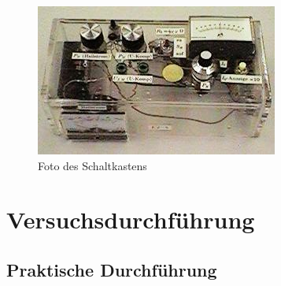 \documentclass[12pt]{scrartcl}
\begin{document}
\begin{figure}[htbp] 
  \centering
    \includegraphics[scale = 0.5]{kasten.JPG}
  	\caption[Foto des Schaltkastens]{Foto des Schaltkastens\footnotemark}
  \label{fig:kasten}
\end{figure}

\section{Versuchsdurchführung}


\subsection{Praktische Durchführung}
\end{document}
